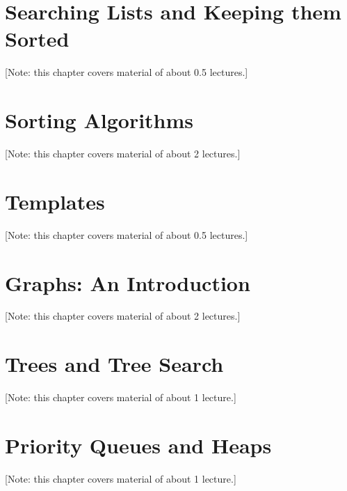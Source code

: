\documentclass{book}
\begin{document}
\chapter{Searching Lists and Keeping them Sorted}
\label{chap:searching}
[Note: this chapter covers material of about 0.5 lectures.]



\chapter{Sorting Algorithms}
\label{chap:sorting}
[Note: this chapter covers material of about 2 lectures.]



\chapter{Templates}
\label{chap:templates}
[Note: this chapter covers material of about 0.5 lectures.]



\chapter{Graphs: An Introduction}
\label{chap:graph-basics}
[Note: this chapter covers material of about 2 lectures.]



\chapter{Trees and Tree Search}
\label{chap:trees}
[Note: this chapter covers material of about 1 lecture.]



\chapter{Priority Queues and Heaps}
\label{chap:priority-queues}
[Note: this chapter covers material of about 1 lecture.]


\end{document}
